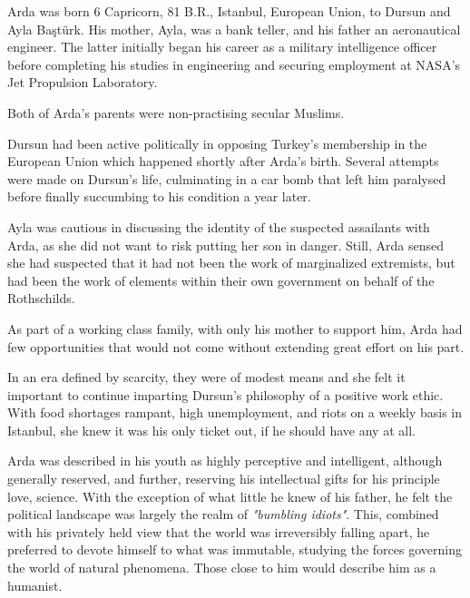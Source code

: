 
Arda was born 6 Capricorn, 81 B.R., Istanbul, European Union, to Dursun and Ayla Baştürk. His mother, Ayla, was a bank teller, and his father an aeronautical engineer. The latter initially began his career as a military intelligence officer before completing his studies in engineering and securing employment at NASA's Jet Propulsion Laboratory. 

Both of Arda's parents were non-practising secular Muslims.

Dursun had been active politically in opposing Turkey's membership in the European Union which happened shortly after Arda's birth. Several attempts were made on Dursun's life, culminating in a car bomb that left him paralysed before finally succumbing to his condition a year later.

Ayla was cautious in discussing the identity of the suspected assailants with Arda, as she did not want to risk putting her son in danger. Still, Arda sensed she had suspected that it had not been the work of marginalized extremists, but had been the work of elements within their own government on behalf of the Rothschilds.

As part of a working class family, with only his mother to support him, Arda had few opportunities that would not come without extending great effort on his part. 

In an era defined by scarcity, they were of modest means and she felt it important to continue imparting Dursun's philosophy of a positive work ethic. With food shortages rampant, high unemployment, and riots on a weekly basis in Istanbul, she knew it was his only ticket out, if he should have any at all.

Arda was described in his youth as highly perceptive and intelligent, although generally reserved, and further, reserving his intellectual gifts for his principle love, science. With the exception of what little he knew of his father, he felt the political landscape was largely the realm of {\it "bumbling idiots"}. This, combined with his privately held view that the world was irreversibly falling apart, he preferred to devote himself to what was immutable, studying the forces governing the world of natural phenomena. Those close to him would describe him as a humanist.

